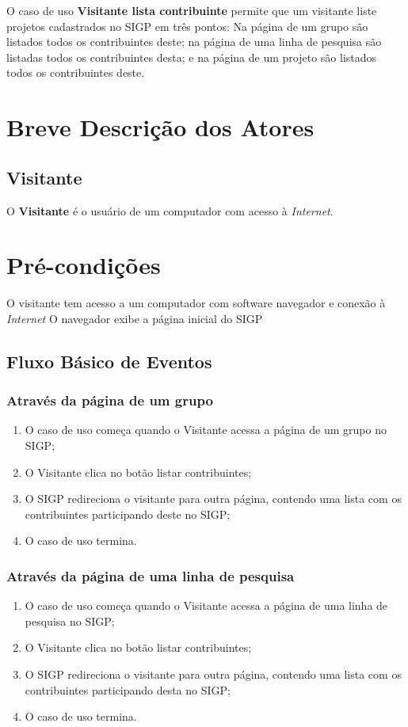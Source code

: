 \documentclass[11pt, a4paper,oneside]{book}
\begin{document}
O caso de uso \textbf{Visitante lista contribuinte} permite que um visitante liste projetos cadastrados no SIGP em três pontos: Na página de um grupo são listados todos os contribuintes deste; na página de uma linha de pesquisa são listadas todos os contribuintes desta; e na página de um projeto são listados todos os contribuintes deste.

\section{Breve Descrição dos Atores}

\subsection{Visitante}

O \textbf{Visitante} é o usuário de um computador com acesso à \emph{Internet}.

\section{Pré-condições}
O visitante tem acesso a um computador com software navegador e conexão à \emph{Internet}
O navegador exibe a página inicial do SIGP

\subsection{Fluxo Básico de Eventos}

\subsubsection{Através da página de um grupo}
\begin{enumerate}
\item O caso de uso começa quando o Visitante acessa a página de um grupo no SIGP;
\item O Visitante clica no botão listar contribuintes;
\item O SIGP redireciona o visitante para outra página, contendo uma lista com os contribuintes participando deste no SIGP;
\item O caso de uso termina.
\end{enumerate}

\subsubsection{Através da página de uma linha de pesquisa}
\begin{enumerate}
\item O caso de uso começa quando o Visitante acessa a página de uma linha de pesquisa no SIGP;
\item O Visitante clica no botão listar contribuintes;
\item O SIGP redireciona o visitante para outra página, contendo uma lista com os contribuintes participando desta no SIGP;
\item O caso de uso termina.
\end{enumerate}
\end{document}
